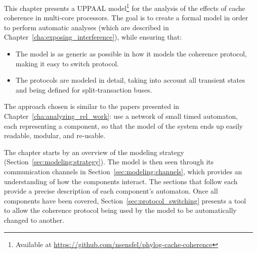 This chapter presents a UPPAAL model\footnote{Available at
\url{https://github.com/nsensfel/phylog-cache-coherence}}
for the analysis of the effects of cache
coherence in multi-core processors. The goal is to create a formal model in
order to perform automatic analyses (which are described in
Chapter~\ref{cha:exposing_interference}), while ensuring that:
\begin{itemize}
\item The model is as generic as possible in how it models the coherence
protocol, making it easy to switch protocol.
\item The protocols are modeled in detail, taking into account all transient
states and being defined for split-transaction buses.
\end{itemize}

The approach chosen is similar to the papers presented in
Chapter~\ref{cha:analyzing_rel_work}: use a network of small timed
automaton, each representing a component, so that the model of the system ends
up easily readable, modular, and re-usable.

The chapter starts by an overview of the modeling strategy
(Section~\ref{sec:modeling:strategy}). The model is then seen through its
communication channels in Section~\ref{sec:modeling:channels}, which provides
an understanding of how the components interact. The sections that follow each
provide a precise description of each component's automaton. Once all
components have been covered, Section~\ref{sec:protocol_switching} presents a
tool to allow the coherence protocol being used by the model to be
automatically changed to another.
